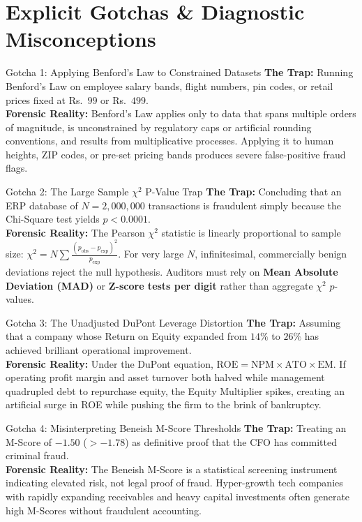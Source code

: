 \section{Explicit Gotchas \& Diagnostic Misconceptions}

\begin{trapbox}{Gotcha 1: Applying Benford's Law to Constrained Datasets}
\textbf{The Trap:} Running Benford's Law on employee salary bands, flight numbers, pin codes, or retail prices fixed at Rs.~$99$ or Rs.~$499$.\\
\textbf{Forensic Reality:} Benford's Law applies only to data that spans multiple orders of magnitude, is unconstrained by regulatory caps or artificial rounding conventions, and results from multiplicative processes. Applying it to human heights, ZIP codes, or pre-set pricing bands produces severe false-positive fraud flags.
\end{trapbox}

\begin{trapbox}{Gotcha 2: The Large Sample $\chi^2$ P-Value Trap}
\textbf{The Trap:} Concluding that an ERP database of $N = 2{,}000{,}000$ transactions is fraudulent simply because the Chi-Square test yields $p < 0.0001$.\\
\textbf{Forensic Reality:} The Pearson $\chi^2$ statistic is linearly proportional to sample size: $\chi^2 = N \sum \frac{(p_{\text{obs}} - p_{\text{exp}})^2}{p_{\text{exp}}}$. For very large $N$, infinitesimal, commercially benign deviations reject the null hypothesis. Auditors must rely on \textbf{Mean Absolute Deviation (MAD)} or \textbf{Z-score tests per digit} rather than aggregate $\chi^2$ $p$-values.
\end{trapbox}

\begin{trapbox}{Gotcha 3: The Unadjusted DuPont Leverage Distortion}
\textbf{The Trap:} Assuming that a company whose Return on Equity expanded from $14\%$ to $26\%$ has achieved brilliant operational improvement.\\
\textbf{Forensic Reality:} Under the DuPont equation, $\text{ROE} = \text{NPM} \times \text{ATO} \times \text{EM}$. If operating profit margin and asset turnover both halved while management quadrupled debt to repurchase equity, the Equity Multiplier spikes, creating an artificial surge in ROE while pushing the firm to the brink of bankruptcy.
\end{trapbox}

\begin{trapbox}{Gotcha 4: Misinterpreting Beneish M-Score Thresholds}
\textbf{The Trap:} Treating an M-Score of $-1.50$ ($> -1.78$) as definitive proof that the CFO has committed criminal fraud.\\
\textbf{Forensic Reality:} The Beneish M-Score is a statistical screening instrument indicating elevated risk, not legal proof of fraud. Hyper-growth tech companies with rapidly expanding receivables and heavy capital investments often generate high M-Scores without fraudulent accounting.
\end{trapbox}


